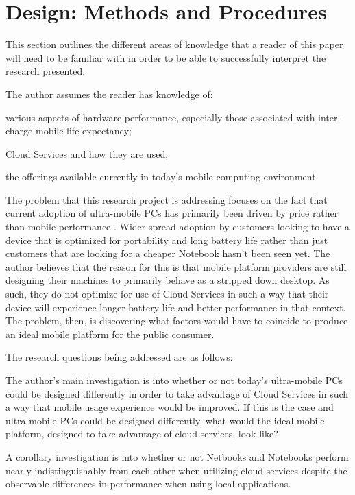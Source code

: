 \section{Design: Methods and Procedures}

This section outlines the different areas of knowledge that a reader of this
paper will need to be familiar with in order to be able to successfully
interpret the research presented.

The author assumes the reader has knowledge of:
\begin{inparaenum}[(1)]
\item various aspects of hardware performance, especially those associated with
  inter-charge mobile life expectancy;
\item Cloud Services and how they are used;
\item the offerings available currently in today's mobile computing environment.
\end{inparaenum}

The problem that this research project is addressing focuses on the fact that
current adoption of ultra-mobile PCs has primarily been driven by price rather
than mobile performance \citep{ap2009}.  Wider spread adoption by customers
looking to have a device that is optimized for portability and long battery life
rather than just customers that are looking for a cheaper Notebook hasn't been
seen yet.  The author believes that the reason for this is that mobile platform
providers are still designing their machines to primarily behave as a stripped
down desktop.  As such, they do not optimize for use of Cloud Services in such a
way that their device will experience longer battery life and better performance
in that context.  The problem, then, is discovering what factors would have to
coincide to produce an ideal mobile platform for the public consumer.

The research questions being addressed are as follows:
\begin{inparaenum}[(1)]
  \item The author's main investigation is into whether or not today's
    ultra-mobile PCs could be designed differently in order to take advantage of
    Cloud Services in such a way that mobile usage experience would be improved.
    If this is the case and ultra-mobile PCs could be designed differently, what
    would the ideal mobile platform, designed to take advantage of cloud
    services, look like?
  \item A corollary investigation is into whether or not Netbooks and Notebooks
    perform nearly indistinguishably from each other when utilizing cloud
    services despite the observable differences in performance when using local
    applications.
\end{inparaenum}


